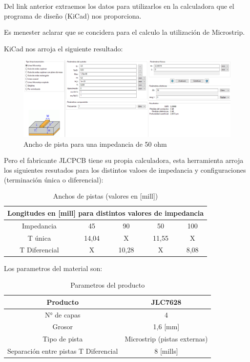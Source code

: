 \documentclass[a4paper,12pt]{report} %
\begin{document}
Del link anterior extraemos los datos para utilizarlos en la calculadora que el programa de diseño (KiCad) nos proporciona.

Es menester aclarar que se concidera para el calculo la utilización de Microstrip.

KiCad nos arroja el siguiente resultado: 

\begin{figure}[H]
	\centering
	\includegraphics[scale=0.4]{Imagenes/PCB/impedancia_kicad}
	\caption{Ancho de pista para una impedancia de 50 ohm}
	\label{impedancia1}
\end{figure}

Pero el fabricante JLCPCB tiene su propia calculadora, esta herramienta arroja los siguientes resutados para los distintos valoes de impedancia y configuraciones (terminación única o diferencial): 

\begin{table} [H]
	\begin{center}
		\begin{tabular}{|c|c|c|c|c|}
			\hline
			\multicolumn{5}{|c|}{Longitudes en [mill] para distintos valores de impedancia} \\ \hline
			Impedancia		& 45 	& 90 	& 50 	& 100 \\ \hline
			T única			& 14,04	& X		& 11,55	& X \\ \hline
			T Diferencial	& X		& 10,28 & X		& 8,08 \\ \hline
		\end{tabular}
	\caption{Anchos de pistas (valores en [mill])}
	\label{impedancias}
	\end{center}
\end{table}

Los parametros del material son: 

\begin{table} [H]
	\begin{center}
		\begin{tabular}{|c||c|}
			\hline
			Producto		& JLC7628  \\ \hline
			N° de capas			& 4	 \\ \hline
			Grosor	& 1,6 [mm]		\\ \hline
			Tipo de pista & Microstrip (pistas externas) \\ \hline
			Separación entre pistas T Diferencial & 8 [mills] \\ \hline
		\end{tabular}
		\caption{Parametros del producto}
		\label{placa}
	\end{center}
\end{table}
\end{document}
